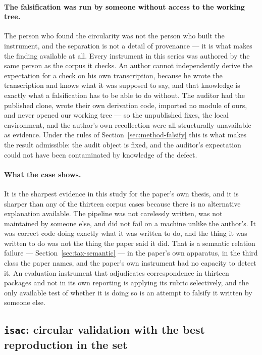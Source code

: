 \documentclass[sigconf,review]{acmart}
\newcommand{\pkg}[1]{\texttt{#1}}
\begin{document}
\paragraph{The falsification was run by someone without access to the working
tree.} The person who found the circularity was not the person who built the
instrument, and the separation is not a detail of provenance --- it is what
makes the finding available at all. Every instrument in this series was
authored by the same person as the corpus it checks. An author cannot
independently derive the expectation for a check on his own transcription,
because he wrote the transcription and knows what it was supposed to say, and
that knowledge is exactly what a falsification has to be able to do without.
The auditor had the published clone, wrote their own derivation code, imported
no module of ours, and never opened our working tree --- so the unpublished
fixes, the local environment, and the author's own recollection were all
structurally unavailable as evidence. Under the rules of
Section~\ref{sec:method-falsify} this is what makes the result admissible: the
audit object is fixed, and the auditor's expectation could not have been
contaminated by knowledge of the defect.

\paragraph{What the case shows.} It is the sharpest evidence in this study for
the paper's own thesis, and it is sharper than any of the thirteen corpus cases
because there is no alternative explanation available. The pipeline was not
carelessly written, was not maintained by someone else, and did not fail on a
machine unlike the author's. It was correct code doing exactly what it was
written to do, and the thing it was written to do was not the thing the paper
said it did. That is a semantic relation failure --- Section~\ref{sec:tax-semantic}
--- in the paper's own apparatus, in the third class the paper names, and the
paper's own instrument had no capacity to detect it. An evaluation instrument
that adjudicates correspondence in thirteen packages and not in its own
reporting is applying its rubric selectively, and the only available test of
whether it is doing so is an attempt to falsify it written by someone else.

\subsection{\pkg{isac}: circular validation with the best reproduction in the set}
\label{sec:case-isac}
\end{document}

